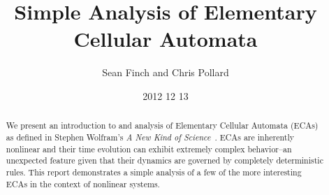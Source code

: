 \documentclass{article}
\author{Sean Finch and Chris Pollard}
\date{2012 12 13}
\title{Simple Analysis of Elementary Cellular Automata}
\begin{document}
\maketitle

\vspace{3in}

\begin{abstract}
    We present an introduction to and analysis of Elementary Cellular
    Automata (ECAs) as defined in Stephen Wolfram's
    \emph{A New Kind of Science}~\cite{anks}.
    ECAs are inherently nonlinear and their time evolution can
    exhibit extremely complex behavior--an unexpected feature given
    that their dynamics are governed by completely deterministic
    rules.
    This report demonstrates a simple analysis of a few of the more
    interesting ECAs in the context of nonlinear systems.
\end{abstract}

\newpage









\end{document}
